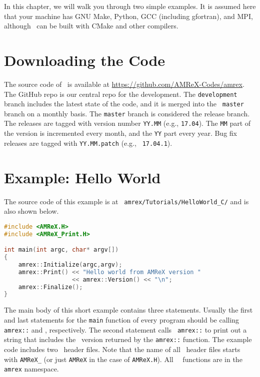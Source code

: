 In this chapter, we will walk you through two simple examples.  It is
assumed here that your machine has GNU Make, Python, GCC (including
gfortran), and MPI, although \amrex\ can be built with CMake and other
compilers. 

\section{Downloading the Code}

The source code of \amrex\ is available at
\url{https://github.com/AMReX-Codes/amrex}.  The GitHub repo is our
central repo for the development.  The {\tt development} branch
includes the latest state of the code, and it is merged into the {\tt
  master} branch on a monthly basis.  The {\tt master} branch is
considered the release branch.  The releases are tagged with version
number {\tt YY.MM} (e.g., {\tt 17.04}).  The {\tt MM} part of the
version is incremented every month, and the {\tt YY} part every year.
Bug fix releases are tagged with {\tt YY.MM.patch} (e.g., {\tt
  17.04.1}).

\section{Example: Hello World}

The source code of this example is at {\tt
  amrex/Tutorials/HelloWorld\_C/} and is also shown below. 

\begin{lstlisting}[language=cpp]
#include <AMReX.H>
#include <AMReX_Print.H>

int main(int argc, char* argv[])
{
    amrex::Initialize(argc,argv);
    amrex::Print() << "Hello world from AMReX version " 
                   << amrex::Version() << "\n";
    amrex::Finalize();
}
\end{lstlisting}

The main body of this short example contains three statements.
Usually the first and last statements for the {\tt main} function of
every program should be calling {\tt amrex::} and
, respectively.  The second statement calls {\tt
  amrex::} to print out a string that includes the
\amrex\ version returned by the {\tt amrex::}
function.  The example code includes two \amrex\ header files.  Note
that the name of all \amrex\ header files starts with {\tt AMReX\_}
(or just {\tt AMReX} in the case of {\tt AMReX.H}).  All \amrex\
\cpp\ functions are in the {\tt amrex} namespace.  

